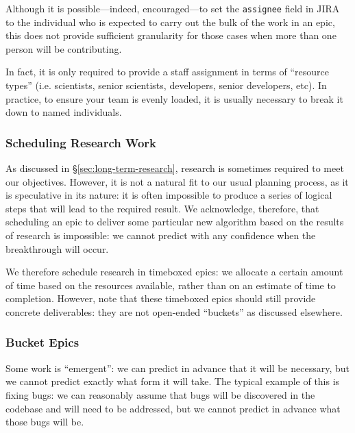 Although it is possible---indeed, encouraged---to set the \texttt{assignee} field in \gls{JIRA} to the individual who is expected to carry out the bulk of the work in an \gls{epic}, this does not provide sufficient granularity for those cases when more than one person will be contributing.

In fact, it is only required to provide a staff assignment in terms of ``resource types'' (i.e. scientists, senior scientists, developers, senior developers, etc).
In practice, to ensure your team is evenly loaded, it is usually necessary to break it down to named individuals.


\subsubsection{Scheduling Research Work}
\label{sec:research}

As discussed in \S\ref{sec:long-term-research}, research is sometimes required
to meet our objectives. However, it is not a natural fit to our usual
planning process, as it is speculative in its nature: it is often
impossible to produce a series of logical steps that will lead to the
required result. We acknowledge, therefore, that scheduling an \gls{epic} to
deliver some particular new \gls{algorithm} based on the results of research
is impossible: we cannot predict with any confidence when the
breakthrough will occur.

We therefore schedule research in \gls{timebox}ed \glspl{epic}: we allocate a certain amount of time based on the resources available, rather than on an estimate of time to completion.
However, note that these \gls{timebox}ed \glspl{epic} should still provide concrete deliverables: they are not open-ended ``buckets'' as discussed elsewhere.

\subsubsection{Bucket Epics}
\label{sec:bucket}

Some work is ``emergent'': we can predict in advance that it will be necessary, but we cannot predict exactly what form it will take.
The typical example of this is fixing bugs: we can reasonably assume that bugs will be discovered in the codebase and will need to be addressed, but we cannot predict in advance what those bugs will be.

